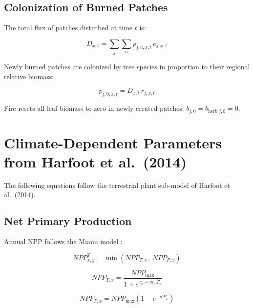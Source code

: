 \documentclass[12pt]{article}
\begin{document}
\subsection{Colonization of Burned Patches}

The total flux of patches disturbed at time $t$ is:

\begin{equation}
    D_{x,t} = \sum_{j}\sum_{a} p_{j,a,x,t}\,e_{j,x,t}
    \label{eq:disturbance}
\end{equation}

Newly burned patches are colonized by tree species in proportion to their regional
relative biomass:

\begin{equation}
    p_{j,0,x,t} = D_{x,t}\, r_{j,x,t}
    \label{eq:colonization}
\end{equation}

Fire resets all leaf biomass to zero in newly created patches: $b_{j,0} = b_{\mathrm{herb}|j,0} = 0$.

\section{Climate-Dependent Parameters from Harfoot et al.\ (2014)}
\label{sec:params}

The following equations follow the terrestrial plant sub-model of Harfoot et al.\ (2014).

\subsection{Net Primary Production}

Annual NPP follows the Miami model \cite{Lieth1975}:

\begin{equation}
    \mathit{NPP}^{T}_{x,y} = \min\!\left(\mathit{NPP}_{T,x},\; \mathit{NPP}_{P,x}\right)
    \label{eq:npp_annual}
\end{equation}

\begin{equation}
    \mathit{NPP}_{T,x} = \frac{\mathit{NPP}_{\max}}{1 + e^{\,c_p - m_p\,\bar{T}_x}}
    \label{eq:npp_temp}
\end{equation}

\begin{equation}
    \mathit{NPP}_{P,x} = \mathit{NPP}_{\max}\!\left(1 - e^{-\rho\, P_x}\right)
    \label{eq:npp_precip}
\end{equation}
\end{document}
